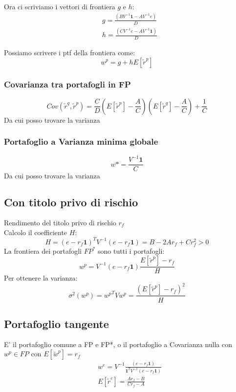 \documentclass[a4paper,notitlepage]{report}%
\begin{document}
\begin{multicols*}{2}
        Ora ci scriviamo i vettori di frontiera $g$ e $h$:
        \begin{align*}
            & g = \frac{(BV^{-1}\mathbf{1} - AV^{-1}e)}{D} \\
            & h = \frac{(CV^{-1}e - AV^{-1}\mathbf{1})}{D}
        \end{align*}

        Possiamo scrivere i ptf della frontiera come:
        \[
            w^p = g+hE[\tilde{r}^p]   
        \]
    
    \subsubsection*{Covarianza tra portafogli in FP}
    \[
        Cov(\tilde{r}^q, \tilde{r}^p ) = \frac{C}{D} \left(E[\tilde{r}^p]-\frac{A}{C}\right) \left(E[\tilde{r}^q]-\frac{A}{C}\right) + \frac{1}{C}
    \]
    Da cui posso trovare la varianza

    \subsubsection*{Portafoglio a Varianza minima globale}
    \[
        w*=\frac{V^{-1}\mathbf{1}}{C}
    \]
    Da cui posso trovare la varianza

    \subsection*{Con titolo privo di rischio}
        Rendimento del titolo privo di rischio $r_f$\\
        Calcolo il coefficiente $H$:
        \[
            H = (e-r_f\mathbf{1})^T V^{-1} (e-r_f\mathbf{1}) = B-2Ar_f+Cr_f^2>0
        \]
        La frontiera dei portafogli $FP^*$ sono tutti i portafogli:
        \[
            w^p = V^{-1} (e-r_f\mathbf{1}) \frac{E[\tilde{r}^p]-r_f}{H}
        \]
        Per ottenere la varianza:
        \[
            \sigma^2(w^p) = { w^p}^T V w^p = \frac{(E[\tilde{r}^p]-r_f)^2}{H}
        \]

    \subsection*{Portafoglio tangente}
    E' il portafoglio comune a FP e FP*, o il portafoglio
    a Covarianza nulla con $w^p\in FP$ con $E[\tilde{w}^p] = r_f$
    \begin{align*}
        & w^e = V^{-1} \frac{(e-r_f\mathbf{1})}{\mathbf{1}^TV^{-1}(e-r_f\mathbf{1})}  \\
        & E[\tilde{r}^e] = \frac{Ar_f-B}{Cr_f-A}  
    \end{align*}



\end{multicols*}
\end{document}
